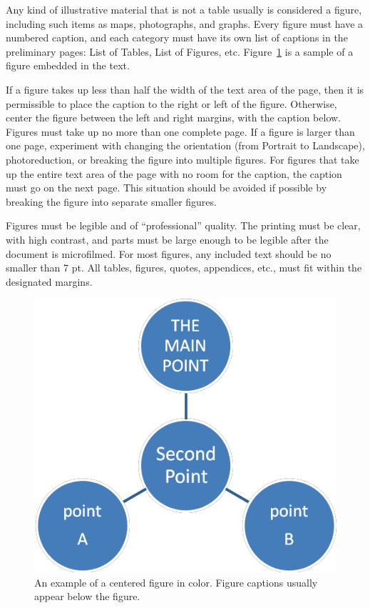 Any kind of illustrative material that is not a table usually is considered a figure, including such items as maps, photographs, and graphs. Every figure must have a numbered caption, and each category must have its own list of captions in the preliminary pages: List of Tables, List of Figures, etc. Figure~\ref{samplefigure} is a sample of a figure embedded in the text.

If a figure takes up less than half the width of the text area of the page, then it is permissible to place the caption to the right or left of the figure. Otherwise, center the figure between the left and right margins, with the caption below. Figures must take up no more than one complete page. If a figure is larger than one page, experiment with changing the orientation (from Portrait to Landscape), photoreduction, or breaking the figure into multiple figures. For figures that take up the entire text area of the page with no room for the caption, the caption must go on the next page. This situation should be avoided if possible by breaking the figure into separate smaller figures.

Figures must be legible and of “professional” quality. The printing must be clear, with high contrast, and parts must be large enough to be legible after the document is microfilmed. For most figures, any included text should be no smaller than 7 pt. All tables, figures, quotes, appendices, etc., must fit within the designated margins.

\begin{figure}
\centering
	\includegraphics{samplefigure1.png} 
\caption{An example of a centered figure in color. Figure captions usually appear below the figure.\label{samplefigure}}	
\end{figure}